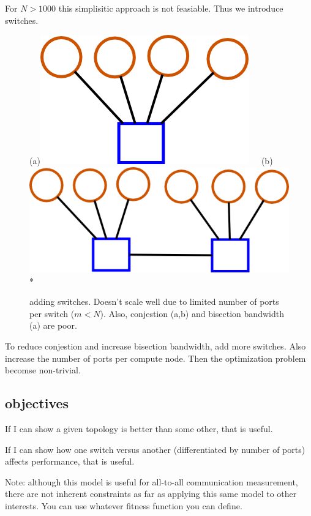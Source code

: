 \documentclass[pdftex]{article}
\begin{document}
For $N>1000$ this simplisitic approach is not feasiable. Thus we introduce switches.
\begin{figure}[h!]
\begin{center}
(a)\includegraphics[scale=0.2]{pictures/N4_n1_M1_m4}\ \ \ 
(b)\includegraphics[scale=0.2]{pictures/N6_n1_M2_m4}\\*
\caption{adding switches. Doesn't scale well due to limited number of ports per switch ($m<N$). Also, conjestion (a,b) and bisection bandwidth (a) are poor.}
\end{center}
\end{figure}

To reduce conjestion and increase bisection bandwidth, add more switches. Also increase the number of ports per compute node. Then the optimization problem becomse non-trivial.

\subsection{objectives}

If I can show a given topology is better than some other, that is useful.

If I can show how one switch versus another (differentiated by number of ports) affects performance, that is useful.

Note: although this model is useful for all-to-all communication measurement, there are not inherent constraints as far as applying this same model to other interests. You can use whatever fitness function you can define.
\end{document}
